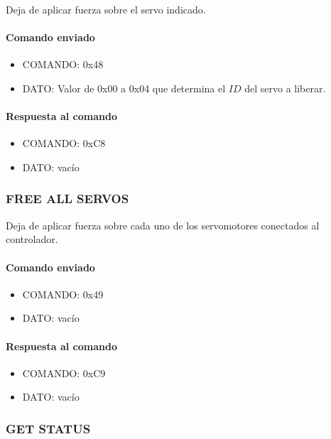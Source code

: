 Deja de aplicar fuerza sobre el servo indicado.

\paragraph*{Comando enviado}

\begin{itemize}
	\item{COMANDO:} 0x48
	\item{DATO:} Valor de 0x00 a 0x04 que determina el $ID$ del servo a liberar.
\end{itemize}

\paragraph*{Respuesta al comando}

\begin{itemize}
	\item{COMANDO:} 0xC8
	\item{DATO:} vac\'io
\end{itemize}

\subsubsection{FREE ALL SERVOS}
\label{hA_protocolo_free_all_servos}

Deja de aplicar fuerza sobre cada uno de los servomotores conectados al controlador.

\paragraph*{Comando enviado}

\begin{itemize}
	\item{COMANDO:} 0x49
	\item{DATO:} vac\'io
\end{itemize}

\paragraph*{Respuesta al comando}

\begin{itemize}
	\item{COMANDO:} 0xC9
	\item{DATO:} vac\'io
\end{itemize}

\subsubsection{GET STATUS}
\label{hA_protocolo_get_status_servos}

